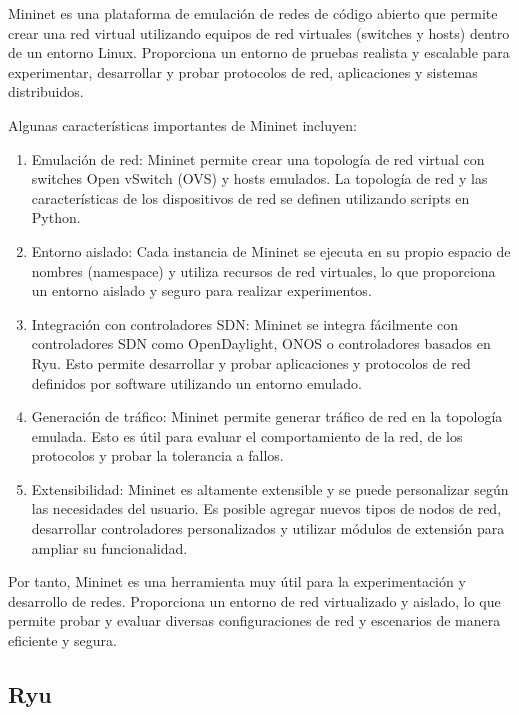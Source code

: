 \documentclass[a4paper, 12pt]{book}
\begin{document}
	Mininet es una plataforma de emulación de redes de código abierto que permite crear una red virtual utilizando equipos de red virtuales (switches y hosts) dentro de un entorno Linux. Proporciona un entorno de pruebas realista y escalable para experimentar, desarrollar y probar protocolos de red, aplicaciones y sistemas distribuidos.
	
	Algunas características importantes de Mininet incluyen:
	
	\begin{enumerate}
		\item 	Emulación de red: Mininet permite crear una topología de red virtual con switches Open vSwitch (OVS) y hosts emulados. La topología de red y las características de los dispositivos de red se definen utilizando scripts en Python.
		\item 	Entorno aislado: Cada instancia de Mininet se ejecuta en su propio espacio de nombres (namespace) y utiliza recursos de red virtuales, lo que proporciona un entorno aislado y seguro para realizar experimentos.
		\item 	Integración con controladores SDN: Mininet se integra fácilmente con controladores SDN como OpenDaylight, ONOS o controladores basados en Ryu. Esto permite desarrollar y probar aplicaciones y protocolos de red definidos por software utilizando un entorno emulado.
		\item 	Generación de tráfico: Mininet permite generar tráfico de red en la topología emulada. Esto es útil para evaluar el comportamiento de la red,  de los protocolos y probar la tolerancia a fallos.
		\item   Extensibilidad: Mininet es altamente extensible y se puede personalizar según las necesidades del usuario. Es posible agregar nuevos tipos de nodos de red, desarrollar controladores personalizados y utilizar módulos de extensión para ampliar su funcionalidad.
	\end{enumerate}
	
	
	Por tanto, Mininet es una herramienta muy útil para la experimentación y desarrollo de redes. Proporciona un entorno de red virtualizado y aislado, lo que permite probar y evaluar diversas configuraciones de red y escenarios de manera eficiente y segura.
		
	
	
	\subsection{Ryu} 
	\label{sec:ryu}
	
\end{document}
